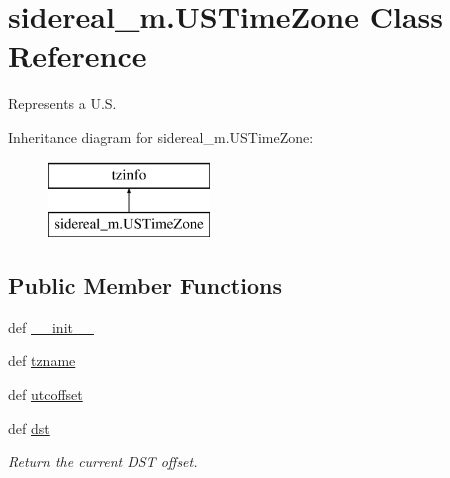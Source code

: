 \hypertarget{classsidereal__m_1_1_u_s_time_zone}{\section{sidereal\-\_\-m.\-U\-S\-Time\-Zone Class Reference}
\label{classsidereal__m_1_1_u_s_time_zone}
}


Represents a U.\-S.  


Inheritance diagram for sidereal\-\_\-m.\-U\-S\-Time\-Zone\-:\begin{figure}[H]
\begin{center}
\leavevmode
\includegraphics[height=2.000000cm]{d3/d6f/classsidereal__m_1_1_u_s_time_zone}
\end{center}
\end{figure}
\subsection*{Public Member Functions}
\begin{DoxyCompactItemize}
\item 
def \hyperlink{classsidereal__m_1_1_u_s_time_zone_aa0f928ffcaabff5216e09c4ca1ca2adb}{\-\_\-\-\_\-init\-\_\-\-\_\-}
\item 
def \hyperlink{classsidereal__m_1_1_u_s_time_zone_afb0ff408514c0a0b96fba362be0200b3}{tzname}
\item 
def \hyperlink{classsidereal__m_1_1_u_s_time_zone_a2f14a004f41a8cdd2629db9958f59b6d}{utcoffset}
\item 
def \hyperlink{classsidereal__m_1_1_u_s_time_zone_a38114cb9e1194574ffc1a39b2453545a}{dst}
\begin{DoxyCompactList}\small\item\em Return the current D\-S\-T offset. \end{DoxyCompactList}\end{DoxyCompactItemize}
